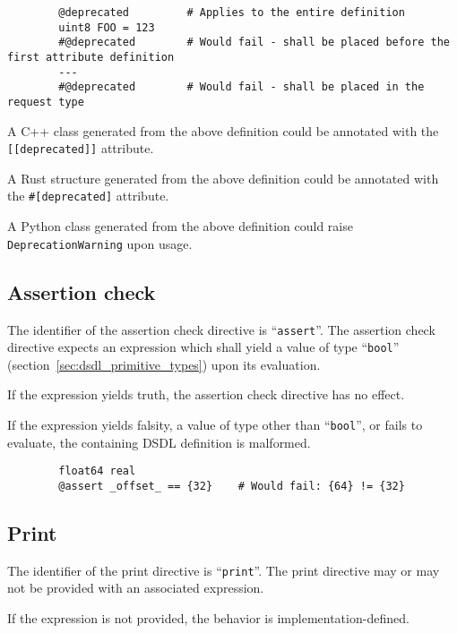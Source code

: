 \begin{remark}
    \begin{verbatim}
        @deprecated         # Applies to the entire definition
        uint8 FOO = 123
        #@deprecated        # Would fail - shall be placed before the first attribute definition
        ---
        #@deprecated        # Would fail - shall be placed in the request type
    \end{verbatim}

    A C++ class generated from the above definition could be annotated with the \verb|[[deprecated]]| attribute.

    A Rust structure generated from the above definition could be annotated with the \verb|#[deprecated]| attribute.

    A Python class generated from the above definition could raise \verb|DeprecationWarning| upon usage.
\end{remark}

\subsection{Assertion check}

The identifier of the assertion check directive is ``\verb|assert|''.
The assertion check directive expects an expression which shall yield a value of type
``\verb|bool|'' (section~\ref{sec:dsdl_primitive_types}) upon its evaluation.

If the expression yields truth, the assertion check directive has no effect.

If the expression yields falsity, a value of type other than ``\verb|bool|'', or fails to evaluate,
the containing DSDL definition is malformed.

\begin{remark}
    \begin{verbatim}
        float64 real
        @assert _offset_ == {32}    # Would fail: {64} != {32}
    \end{verbatim}
\end{remark}

\subsection{Print}

The identifier of the print directive is ``\verb|print|''.
The print directive may or may not be provided with an associated expression.

If the expression is not provided, the behavior is implementation-defined.

